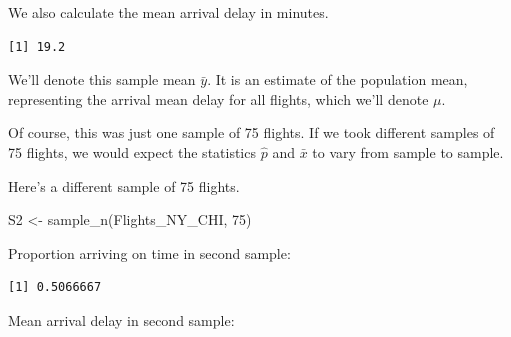 \documentclass[
  letterpaper,
  DIV=11,
  numbers=noendperiod]{scrreprt}
\newenvironment{Shaded}{\begin{snugshade}}{\end{snugshade}}
\newcommand{\CommentTok}[1]{\textcolor[rgb]{0.37,0.37,0.37}{#1}}
\newcommand{\DecValTok}[1]{\textcolor[rgb]{0.68,0.00,0.00}{#1}}
\newcommand{\FunctionTok}[1]{\textcolor[rgb]{0.28,0.35,0.67}{#1}}
\newcommand{\NormalTok}[1]{\textcolor[rgb]{0.00,0.23,0.31}{#1}}
\newcommand{\OtherTok}[1]{\textcolor[rgb]{0.00,0.23,0.31}{#1}}
\newcommand{\SpecialCharTok}[1]{\textcolor[rgb]{0.37,0.37,0.37}{#1}}
\newcommand{\StringTok}[1]{\textcolor[rgb]{0.13,0.47,0.30}{#1}}
\begin{document}
We also calculate the mean arrival delay in minutes.

\begin{Shaded}
\end{Shaded}

\begin{verbatim}
[1] 19.2
\end{verbatim}

We'll denote this sample mean \(\bar{y}\). It is an estimate of the
population mean, representing the arrival mean delay for all flights,
which we'll denote \(\mu\).

Of course, this was just one sample of 75 flights. If we took different
samples of 75 flights, we would expect the statistics \(\hat{p}\) and
\(\bar{x}\) to vary from sample to sample.

Here's a different sample of 75 flights.

\begin{Shaded}
\begin{Highlighting}[]
\NormalTok{S2 }\OtherTok{\textless{}{-}} \FunctionTok{sample\_n}\NormalTok{(Flights\_NY\_CHI, }\DecValTok{75}\NormalTok{)}
\end{Highlighting}
\end{Shaded}

Proportion arriving on time in second sample:

\begin{Shaded}
\end{Shaded}

\begin{verbatim}
[1] 0.5066667
\end{verbatim}

Mean arrival delay in second sample:
\end{document}
